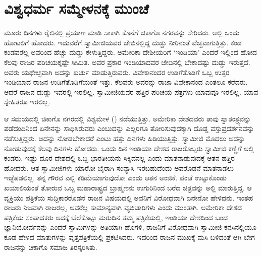 
\chapter{ವಿಶ್ವಧರ್ಮ ಸಮ್ಮೇಳನಕ್ಕೆ ಮುಂಚೆ}

 ಮೂರು ದಿನಗಳು ರೈಲಿನಲ್ಲಿ ಪ್ರಯಾಣ ಮಾಡಿ ಸಾಕಾಗಿ ಕೊನೆಗೆ ಚಿಕಾಗೊ ನಗರವನ್ನು ಸೇರಿದರು. ಅಲ್ಲಿ ಒಂದು ಹೋಟಲಿಗೆ ಹೋದರು. ಇದುವರೆಗೆ ಸ್ವಾಮೀಜಿಯವರ ಜೇಬಿನಲ್ಲಿದ್ದ ದುಡ್ಡು ನೀರಿನಂತೆ ವೆಚ್ಚವಾಗುತ್ತಿತ್ತು. ಕಂಡ ಕಂಡವರೆಲ್ಲ ಅವರಿಂದ ಹೆಚ್ಚು ದುಡ್ಡು ಕೇಳುತ್ತಿದ್ದರು. ಅಮೇರಿಕಾ ದೇಶೀಯರಿಗೆ ‘ಇಂಡಿಯಾ’ ಎಂದರೆ ಇಲ್ಲಿಂದ ಹೋದ ಕೆಲವು ರಾಜರ ಪರಿಚಯಕ್ಕಷ್ಟೇ ಸೀಮಿತ. ಅವರ ಪ್ರಕಾರ ಇಂಡಿಯಾದವರ ಜೇಬಿನಲ್ಲಿ ಬೇಕಾದಷ್ಟು ದುಡ್ಡು ಇರುತ್ತದೆ. ಅವರು ಯಥೇಚ್ಛವಾಗಿ ಅದನ್ನು ಖರ್ಚು ಮಾಡುತ್ತಿರುವರು. ವಿವೇಕಾನಂದರ ಉಡಿಗೆತೊಡಿಗೆ ಒಬ್ಬ ಉತ್ತರ ಇಂಡಿಯಾದ ರಾಜನ ಉಡಿಗೆತೊಡಿಗೆಯಂತೆ ಇತ್ತು. ಕೆಲವರು ಅವರನ್ನು ರಾಜಾ ವಿವೇಕಾನಂದ ಎಂತಲೂ ಕರೆದರು. ಆದರೆ ರಾಜನ ದುಡ್ಡು ಇವರಲ್ಲಿ ಇರಲಿಲ್ಲ. ಸ್ವಾಮೀಜಿಯವರ ಹತ್ತಿರ ಪರಿಚಯ ಪತ್ರಗಳು ಯಾವುವೂ ಇರಲಿಲ್ಲ. ಯಾವ ಸ್ನೇಹಿತರೂ ಇರಲಿಲ್ಲ. 

 ಆ ಸಮಯದಲ್ಲಿ ಚಿಕಾಗೊ ನಗರದಲ್ಲಿ ವಿಶ್ವಮೇಳ () ನಡೆಯುತ್ತಿತ್ತು. ಅಮೇರಿಕಾ ದೇಶದವರು ತಾವು ಸ್ವಾತಂತ್ರ್ಯವನ್ನು ಪಡೆದಂದಿನಿಂದ ಏನೇನನ್ನು ಸಾಧಿಸಿರುವರು ಎಂಬುದನ್ನು ಎಲ್ಲರಿಗೂ ತೋರಿಸುವುದಕ್ಕಾಗಿ ದೊಡ್ಡ ವಸ್ತುಪ್ರದರ್ಶನವನ್ನು ನಡೆಸುತ್ತಿದ್ದರು. ಅದನ್ನು ನೋಡಬೇಕಾದರೆ ಎಂಟು ಹತ್ತು ದಿನಗಳು ಹಿಡಿಯುತ್ತಿತ್ತು. ಸ್ವಾಮೀಜಿ ಮೊದಲು ಅದನ್ನು ನೋಡುವುದಕ್ಕೆ ಕೆಲವು ದಿನಗಳು ಹೋದರು. ಒಂದು ದಿನ ಇಂಡಿಯಾ ದೇಶದ ರಾಜರೊಬ್ಬರು ಸ್ವಾಮೀಜಿ ಕಣ್ಣಿಗೆ ಅಲ್ಲಿ ಕಂಡರು. ಇಷ್ಟು ದೂರ ದೇಶದಲ್ಲಿ ಒಬ್ಬ ಭಾರತೀಯನು ಸಿಕ್ಕಿದನಲ್ಲ ಎಂದು ಮಾತನಾಡುವುದಕ್ಕೆ ಆತನ ಹತ್ತಿರ ಹೋದರು. ಆತ ಸ್ವಾಮೀಜಿಗಳು ಯಾರೋ ಬೈರಾಗಿ ಸಂನ್ಯಾಸಿ ಇರಬಹುದೆಂದು ಅವರೊಡನೆ ಮಾತನಾಡಲು ಇಚ್ಛೆಪಡಲಿಲ್ಲ. ತನ್ನ ಗೌರವ ಎಲ್ಲಿ ಕಡಿಮೆಯಾಗುವುದೋ ಎಂದು ಆತನ ಅಂಜಿಕೆ. ಪಂಚೆ ಉಟ್ಟುಕೊಂಡು ಖಯಾಲಿಯಂತೆ ತೋರುವ ಒಬ್ಬ ಮಹಾರಾಷ್ಟ್ರದ ಬ್ರಾಹ್ಮಣನು ಉಗುರಿನಿಂದ ಬರೆದ ಚಿತ್ರವನ್ನು ಅಲ್ಲಿ ಮಾರುತ್ತಿದ್ದ. ಆ ವ್ಯಕ್ತಿಯು ಪತ್ರಿಕೆಯ ಸುದ್ದಿಕಾರರೊಡನೆ ರಾಜನ ವಿಷಯದಲ್ಲಿ ಅವನಿಗೆ ವಿರೋಧವಾಗಿ ಏನೇನೋ ಹೇಳಿದನು. ಇಂತಹ ರಾಜರು ನಿಜವಾಗಿ ರಾಜರಲ್ಲ, ಅವರೆಲ್ಲ ಸಾಮಾನ್ಯವಾಗಿ ವ್ಯಭಿಚಾರಿಗಳು ಎಂದು ಮುಂತಾಗಿ. ಅಮೇರಿಕಾ ದೇಶದ ಪತ್ರಿಕೆಯ ಸಂಪಾದಕರು ಅದಕ್ಕೆ ಬೆಲೆಕೊಟ್ಟು ಮರುದಿನ ತಮ್ಮ ಪತ್ರಿಕೆಯಲ್ಲಿ, ಇಂಡಿಯಾ ದೇಶದಿಂದ ಬಂದ ಜ್ಞಾನಿಯೋರ್ವನನ್ನು ಎಂದರೆ ಸ್ವಾಮಿಗಳನ್ನು ಅತಿಯಾಗಿ ಹೊಗಳಿ, ರಾಜನಿಗೆ ವಿರೋಧವಾಗಿ ಸ್ವಾಮೀಜಿ ಕನಸಿನಲ್ಲಿಯೂ ಕೂಡ ಹೇಳದ ಮಾತುಗಳನ್ನು ವೃತ್ತಪತ್ರಿಕೆಯಲ್ಲಿ ಪ್ರಕಟಿಸಿದರು. ಇದರಿಂದ ರಾಜನ ಮುಖಕ್ಕೆ ಮಸಿ ಬಳಿದಂತೆ ಆಗಿ ಬೇಗ ರಾಜನನ್ನು ಚಿಕಾಗೊ ಸಮಾಜ ತಿರಸ್ಕರಿಸಿತು. 

